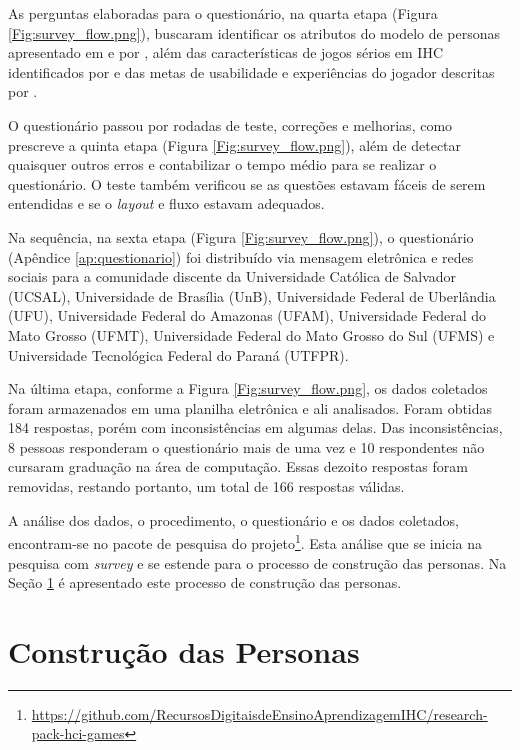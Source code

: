 As perguntas elaboradas para o questionário, na quarta etapa (Figura \ref{Fig:survey_flow.png}), buscaram identificar os atributos do modelo de personas apresentado em \citeauthor{usability2020} e por , além das características de jogos sérios em IHC identificados por  e das metas de usabilidade e experiências do jogador descritas por .

O questionário passou por rodadas de teste, correções e melhorias, como prescreve a quinta etapa (Figura \ref{Fig:survey_flow.png}), além de detectar quaisquer outros erros e contabilizar o tempo médio para se realizar o questionário. O teste também verificou se as questões estavam fáceis de serem entendidas e se o \textit{layout} e fluxo estavam adequados.

Na sequência, na sexta etapa (Figura \ref{Fig:survey_flow.png}), o questionário (Apêndice \ref{ap:questionario}) foi distribuído via mensagem eletrônica e redes sociais para a comunidade discente da Universidade Católica de Salvador (UCSAL), Universidade de Brasília (UnB), Universidade Federal de Uberlândia (UFU), Universidade Federal do Amazonas (UFAM),  Universidade Federal do Mato Grosso (UFMT), Universidade Federal do Mato Grosso do Sul (UFMS) e Universidade Tecnológica Federal do Paraná (UTFPR).

Na última etapa, conforme a Figura \ref{Fig:survey_flow.png}, os dados coletados foram armazenados em uma planilha eletrônica e ali analisados. Foram obtidas 184 respostas, porém com inconsistências em algumas delas. Das inconsistências, 8 pessoas responderam o questionário mais de uma vez e 10 respondentes não cursaram graduação na área de computação. Essas dezoito respostas foram removidas, restando portanto, um total de 166 respostas válidas. 

A análise dos dados, o procedimento, o questionário e os dados coletados, encontram-se no pacote de pesquisa do projeto\footnote{\url{https://github.com/RecursosDigitaisdeEnsinoAprendizagemIHC/research-pack-hci-games}}. Esta análise que se inicia na pesquisa com \textit{survey} e se estende para o processo de construção das personas. Na Seção \ref{sec:const_person} é apresentado este processo de construção das personas.

\section{Construção das Personas}
\label{sec:const_person}

